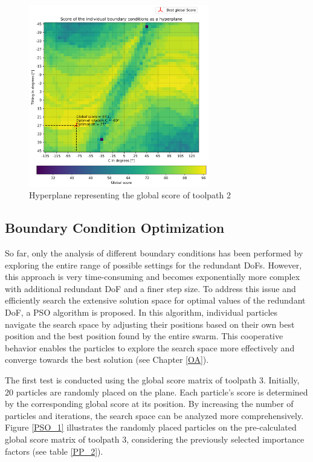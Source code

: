 \begin{figure}[H]
	\centerline{\includegraphics[width=0.7\textwidth]{figures/best_2D_2.png}}
	\caption{Hyperplane representing the global score of toolpath 2}
	\label{best_2D_2}
\end{figure}



\subsection{Boundary Condition Optimization }
So far, only the analysis of different boundary conditions has been performed by exploring the entire range of possible settings for the redundant \acrshort{DoF}s. However, this approach is very time-consuming and becomes exponentially more complex with additional redundant \acrshort{DoF} and a finer step size. To address this issue and efficiently search the extensive solution space for optimal values of the redundant \acrshort{DoF}, a \acrshort{PSO} algorithm is proposed. In this algorithm, individual particles navigate the search space by adjusting their positions based on their own best position and the best position found by the entire swarm. This cooperative behavior enables the particles to explore the search space more effectively and converge towards the best solution (see Chapter \ref{OA}).

The first test is conducted using the global score matrix of toolpath 3. Initially, 20 particles are randomly placed on the plane. Each particle's score is determined by the corresponding global score at its position. By increasing the number of particles and iterations, the search space can be analyzed more comprehensively. Figure \ref{PSO_1} illustrates the randomly placed particles on the pre-calculated global score matrix of toolpath 3, considering the previously selected importance factors (see table \ref{PP_2}).

